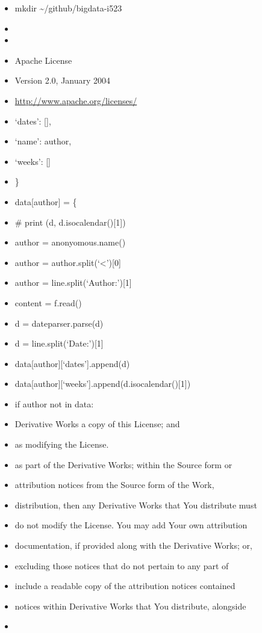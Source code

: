 \begin{itemize}
\item
  mkdir \textasciitilde{}/github/bigdata-i523
\item
\item
\item
  Apache License
\item
  Version 2.0, January 2004
\item
  \url{http://www.apache.org/licenses/}
\item
  `dates': {[}{]},
\item
  `name': author,
\item
  `weeks': {[}{]}
\item
  \}
\item
  data{[}author{]} = \{
\item
  \# print (d, d.isocalendar(){[}1{]})
\item
  author = anonyomous.name()
\item
  author = author.split(`\textless{}'){[}0{]}
\item
  author = line.split(`Author:'){[}1{]}
\item
  content = f.read()
\item
  d = dateparser.parse(d)
\item
  d = line.split(`Date:'){[}1{]}
\item
  data{[}author{]}{[}`dates'{]}.append(d)
\item
  data{[}author{]}{[}`weeks'{]}.append(d.isocalendar(){[}1{]})
\item
  if author not in data:
\item
  Derivative Works a copy of this License; and
\item
  as modifying the License.
\item
  as part of the Derivative Works; within the Source form or
\item
  attribution notices from the Source form of the Work,
\item
  distribution, then any Derivative Works that You distribute must
\item
  do not modify the License. You may add Your own attribution
\item
  documentation, if provided along with the Derivative Works; or,
\item
  excluding those notices that do not pertain to any part of
\item
  include a readable copy of the attribution notices contained
\item
  notices within Derivative Works that You distribute, alongside
\item

\end{itemize}
